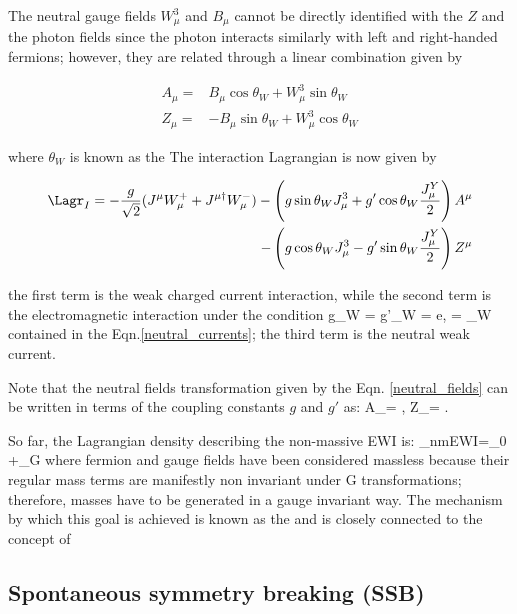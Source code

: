The neutral gauge fields $W^3_\mu$ and $B_\mu$ cannot be directly identified with the $Z$ and the photon fields since the photon interacts similarly with left and right-handed fermions; however, they are related through a linear combination given by

\begin{align}\label{neutral_fields}
A_\mu = &  B_\mu \cos\theta_W + W^3_\mu \sin\theta_W \\ 
Z_\mu = & -B_\mu \sin\theta_W + W^3_\mu \cos\theta_W \nonumber 
\end{align}

\noindent where $\theta_W$ is known as the  The interaction Lagrangian is now given by

\begin{align}
\Lagr_I =-\frac{g}{\sqrt{2}}(J^\mu W_\mu^+ + J^{\mu\dagger}W_\mu^-) -\left(g\sin\theta_W J_\mu^3 + g'\cos\theta_W \frac{J_\mu^Y}{2} \right)A^\mu \\ \nonumber
- \left(g\cos\theta_W J_\mu^3 - g'\sin\theta_W \frac{J_\mu^Y}{2} \right)Z^\mu 
\end{align}

\noindent the first term is the weak charged current interaction, while the second term is the electromagnetic interaction under the condition
\beqn
g\sin\theta_W = g'\cos\theta_W = e, \quad {}= \tan\theta_W  
\eeqn
\noindent contained in the Eqn.\ref{neutral_currents}; the third term is the neutral weak current.

Note that the neutral fields transformation given by the Eqn. \ref{neutral_fields} can be written in terms of the coupling constants $g$ and $g'$ as:
\beqn\label{neutral_bosons}
A_\mu= , \qquad  Z_\mu= .
\eeqn

So far, the Lagrangian density describing the non-massive EWI is:
\beqn\label{nmewi_lagr}
\Lagr_{nmEWI}=\Lagr_0 +\Lagr_G
\eeqn
\noindent where fermion and gauge fields have been considered massless because their regular mass terms are manifestly non invariant under G transformations; therefore, masses have to be generated in a gauge invariant way. The mechanism by which this goal is achieved is known as the  and is closely connected to the concept of 

\subsection{Spontaneous symmetry breaking (SSB)}


